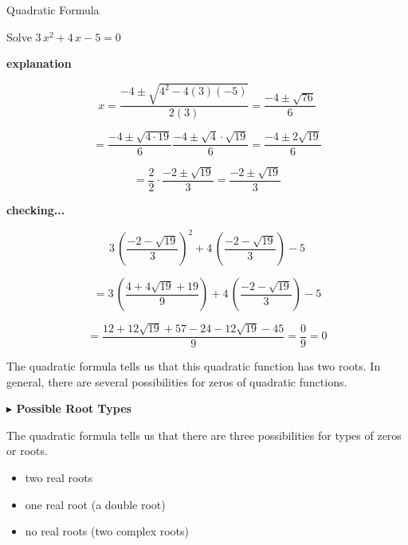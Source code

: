 \documentclass{ximera}
\begin{document}
\begin{example} Quadratic Formula


Solve $3 \, x^2 + 4 \, x - 5 = 0$ 

\textbf{\textcolor{red!75!green}{explanation}} 


\[
x = \frac{-4 \pm \sqrt{4^2 - 4 (3)(-5)}}{2(3)} = \frac{-4 \pm \sqrt{76}}{6}
\]

\[
= \frac{-4 \pm \sqrt{4 \cdot 19}}{6} \frac{-4 \pm \sqrt{4} \cdot \sqrt{19}}{6} = \frac{-4 \pm 2\sqrt{19}}{6}
\]

\[
= \frac{2}{2} \cdot \frac{-2 \pm \sqrt{19}}{3} = \frac{-2 \pm \sqrt{19}}{3}
\]



\textbf{checking...} 


\[
3 \, \left( \frac{-2 - \sqrt{19}}{3} \right)^2 + 4 \, \left( \frac{-2 - \sqrt{19}}{3} \right) - 5 
\]

\[
=  3 \, \left( \frac{4 + 4\sqrt{19}+19}{9} \right) + 4 \, \left( \frac{-2 - \sqrt{19}}{3} \right) - 5
\]


\[
= \frac{12 + 12\sqrt{19} + 57 - 24 - 12\sqrt{19} - 45}{9} = \frac{0}{9} = 0
\]

\end{example}

The quadratic formula tells us that this quadratic function has two roots.  In general, there are several possibilities for zeros of quadratic functions.




\textbf{\textcolor{blue!55!black}{$\blacktriangleright$ Possible Root Types}} 


The quadratic formula tells us that there are three possibilities for types of zeros or roots.


\begin{itemize}
\item two real roots
\item one real root (a double root)
\item no real roots (two complex roots)
\end{itemize}
\end{document}
